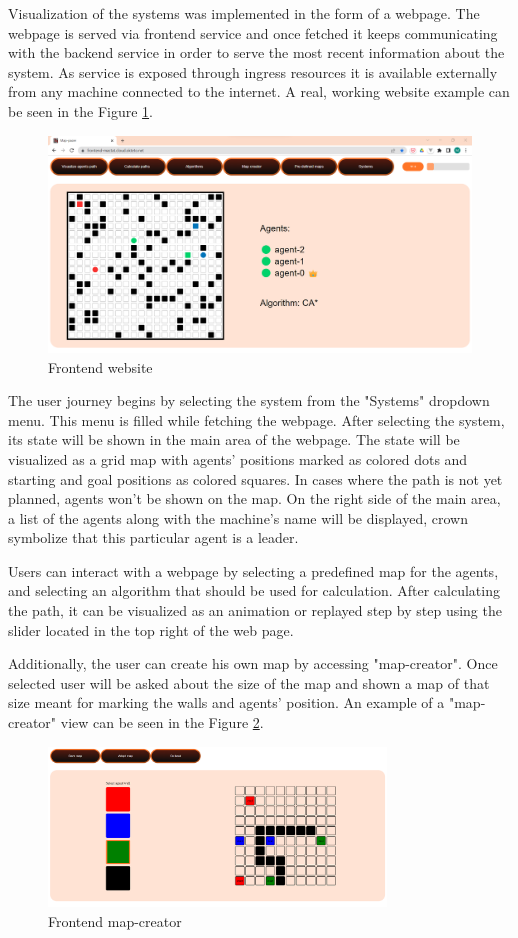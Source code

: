Visualization of the systems was implemented in the form of a webpage. The webpage is served via frontend service and once fetched it keeps communicating with the backend service in order to serve the most recent information about the system. As service is exposed through ingress resources it is available externally from any machine connected to the internet. A real, working website example can be seen in the Figure \ref{fig:frontend}.

\begin{figure}[H]
    \centering
    \includegraphics[width=\textwidth]{pictures/frontend.png}
    \caption{ Frontend website } 
    \label{fig:frontend}
\end{figure}

The user journey begins by selecting the system from the "Systems" dropdown menu. This menu is filled  while fetching the webpage. After selecting the system, its state will be shown in the main area of the webpage. The state will be visualized as a grid map with agents' positions marked as colored dots and starting and goal positions as colored squares. In cases where the path is not yet planned, agents won't be shown on the map. On the right side of the main area, a list of the agents along with the machine's name will be displayed, crown symbolize that this particular agent is a leader.

Users can interact with a webpage by selecting a predefined map for the agents, and selecting an algorithm that should be used for calculation. After calculating the path, it can be visualized as an animation or replayed step by step using the slider located in the top right of the web page.

Additionally, the user can create his own map by accessing "map-creator". Once selected user will be asked about the size of the map and shown a map of that size meant for marking the walls and agents' position. An example of a "map-creator" view can be seen in the Figure \ref{fig:map-creator}.

\begin{figure}[H]
    \centering
    \includegraphics[width=0.8\textwidth]{pictures/map-creator.png}
    \caption{Frontend map-creator} 
    \label{fig:map-creator}
\end{figure}